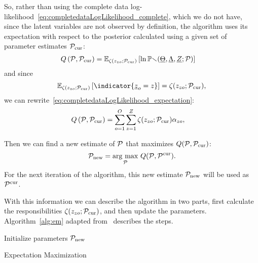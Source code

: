 \documentclass{ifacconf}  %
\begin{document}
So, rather than using the complete data log-likelihood~\eqref{eq:completedataLogLikelihood_complete}, which we do not have, since the latent variables are not observed by definition, the \EM{} algorithm uses its expectation with respect to the posterior calculated using a given set of parameter estimates $\mathcal{P}_{\mathrm{cur}}$:
\begin{align}
  \label{eq:completedataLogLikelihood_expectation}
 Q\left(\set{P},\set{P}_{\mathrm{cur}}\right) &= \expectation[{\zeta(z_{zo};\set{P}_{\mathrm{cur}})}]{\ln\probability{\random{\Theta},\random{\Lambda},\random{Z};\set{P}}}
\end{align}
and since \[\expectation[{\zeta(z_{zo};\set{P}_{\mathrm{cur}})}]{\indicator{\random{z}_{o}=z}}=\zeta(z_{zo};\set{P}_{\mathrm{cur}}),\]
we can rewrite~\eqref{eq:completedataLogLikelihood_expectation}:
\begin{align}
  \label{eq:completedataLogLikelihood_expectation_developed}
Q\left(\set{P},\set{P}_{\mathrm{cur}}\right) &= \sum_{o=1}^{O}\sum_{z=1}^{Z}  \zeta(z_{zo};\set{P}_{\mathrm{cur}})\alpha_{zo},
\end{align}

Then we can find a new estimate of $\mathcal{P}$ that maximizes $Q(\mathcal{P},\mathcal{P}_{\mathrm{cur}})$:
\begin{equation} \label{eq:Mstep}
  \set{P}_{\mathrm{new}}=\underset{\set{P}}{\argmax}\ Q(\set{P},\set{P}^{\mathrm{cur}}).
\end{equation}
For the next iteration of the algorithm, this new estimate $\mathcal{P}_{\mathrm{new}}$ will be used as $\mathcal{P}^{\mathrm{cur}}$.

With this information we can describe the \EM{} algorithm in two parts, first calculate the responsibilities $\zeta(z_{zo};\mathcal{P}_{\mathrm{cur}})$, and then update the parameters.
Algorithm~\ref{alg:em} adapted from~\mbox{\cite[Chapter 9]{Bishop2006}} describes the steps.

\begin{algorithm2e}[h]
  \DontPrintSemicolon%
  Initialize parameters $\mathcal{P}_{\mathrm{new}}$\;
 \caption{Expectation Maximization}\label{alg:em}
\end{algorithm2e}
\end{document}
